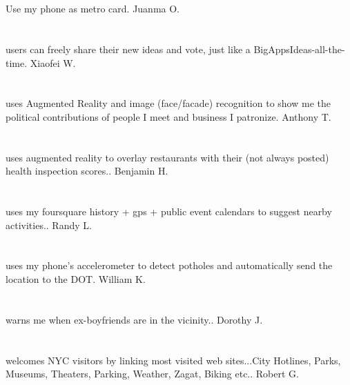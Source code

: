 \section{} Use my phone as metro card. Juanma O.
\section{}users can freely share their new ideas and vote,  just like a BigAppsIdeas-all-the-time. Xiaofei W.
\section{}uses Augmented Reality and image (face/facade) recognition to show me the political contributions of people I meet and business I patronize. Anthony T.
\section{}uses augmented reality to overlay restaurants with their (not always posted) health inspection scores.. Benjamin H.
\section{}uses my foursquare history + gps + public event calendars to suggest nearby activities.. Randy L.
\section{}uses my phone's accelerometer to detect potholes and automatically send the location to the DOT. William K.
\section{}warns me when ex-boyfriends are in the vicinity.. Dorothy J.
\section{}welcomes NYC visitors by linking most visited web sites...City Hotlines,  Parks,  Museums,  Theaters,  Parking,  Weather,  Zagat,  Biking etc.. Robert G.
